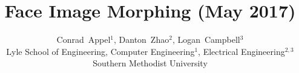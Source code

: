 \documentclass[journal]{IEEEtran}
\begin{document}
%
\title{Face Image Morphing (May 2017)}


\author{Conrad~Appel$^1$, Danton~Zhao$^2$, Logan~Campbell$^3$\\ 
		Lyle School of Engineering, Computer Engineering$^1$, Electrical Engineering$^{2,3}$\\
		Southern Methodist University
        }
        



% 
\end{document}
